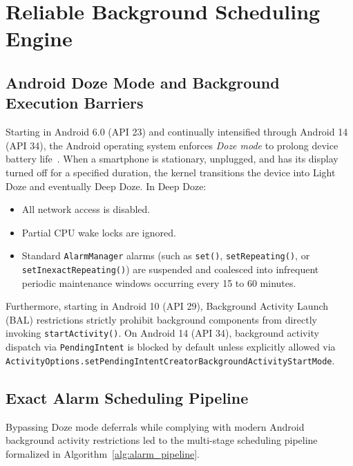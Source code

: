 \documentclass[11pt,a4paper]{article}
\begin{document}
\section{Reliable Background Scheduling Engine}
\label{sec:background_scheduling}

\subsection{Android Doze Mode and Background Execution Barriers}

Starting in Android 6.0 (API 23) and continually intensified through Android 14 (API 34), the Android operating system enforces \emph{Doze mode} to prolong device battery life~\cite{google2024alarms}. When a smartphone is stationary, unplugged, and has its display turned off for a specified duration, the kernel transitions the device into Light Doze and eventually Deep Doze. In Deep Doze:
\begin{itemize}[leftmargin=*]
    \item All network access is disabled.
    \item Partial CPU wake locks are ignored.
    \item Standard \texttt{AlarmManager} alarms (such as \texttt{set()}, \texttt{setRepeating()}, or \texttt{setInexactRepeating()}) are suspended and coalesced into infrequent periodic maintenance windows occurring every 15 to 60 minutes.
\end{itemize}
Furthermore, starting in Android 10 (API 29), Background Activity Launch (BAL) restrictions strictly prohibit background components from directly invoking \texttt{startActivity()}. On Android 14 (API 34), background activity dispatch via \texttt{PendingIntent} is blocked by default unless explicitly allowed via \texttt{ActivityOptions.setPendingIntentCreatorBackgroundActivityStartMode}.

\subsection{Exact Alarm Scheduling Pipeline}

Bypassing Doze mode deferrals while complying with modern Android background activity restrictions led to the multi-stage scheduling pipeline formalized in Algorithm~\ref{alg:alarm_pipeline}.
\end{document}

